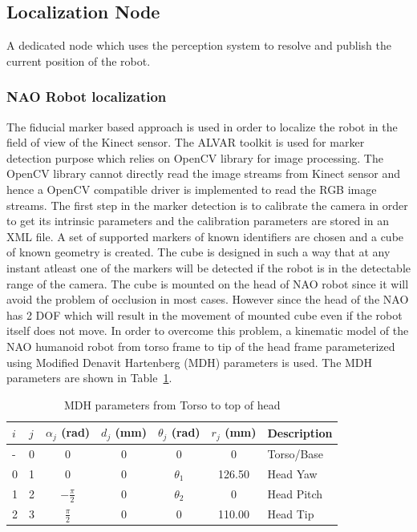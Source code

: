 \subsection{Localization Node} A dedicated node which uses the perception system to resolve and publish the current position of the robot.

\subsubsection{NAO Robot localization}
The fiducial marker based approach is used in order to localize the robot in the field of view of the Kinect sensor. The ALVAR \cite{ALVAR} toolkit is used for marker detection purpose which relies on OpenCV library for image processing. The OpenCV library cannot directly read the image streams from Kinect sensor and hence a OpenCV compatible driver is implemented to read the RGB image streams. The first step in the marker detection is to calibrate the camera in order to get its intrinsic parameters and the calibration parameters are stored in an XML file. A set of supported markers of known identifiers are chosen and a cube of known geometry is created. The cube is designed in such a way that at any instant atleast one of the markers will be detected if the robot is in the detectable range of the camera. The cube is mounted on the head of NAO robot since it will avoid the problem of occlusion in most cases. However since the head of the NAO has 2 DOF which will result in the movement of mounted cube even if the robot itself does not move. In order to overcome this problem, a kinematic model of the NAO humanoid robot from torso frame to tip of the head frame parameterized using Modified Denavit Hartenberg (MDH) \cite{khalil2004modeling} parameters is used. The MDH parameters are shown in Table~\ref{table:nao_mdh}.

\begin{table}[H]
\centering
\small
\caption{MDH parameters from Torso to top of head}
\label{table:nao_mdh}
\begin{tabular}{|l|l|c|c|c|c|p{2cm}|}
\hline
  \textbf{$i$}  & \textbf{$j$}  & \textbf{$\alpha_j$ (rad)} & \textbf{$d_j$ (mm)} & \textbf{$\theta_j$ (rad)} & \textbf{$r_j$ (mm)} & \textbf{Description}
  \tabularnewline \hline
  - & 0 & 0 & 0 & 0 & 0 & Torso/Base
                                          \tabularnewline\hline
                                          
  0 & 1 & 0 & 0 & $\theta_1$ & 126.50 & Head Yaw
                                          \tabularnewline\hline
                       
  1 & 2 & $-\frac{\pi}{2}$ & 0 & $\theta_2$ & 0 & Head Pitch
                                          \tabularnewline\hline                    
  
  2 & 3 & $\frac{\pi}{2}$ & 0 & 0 & 110.00 & Head Tip
                                          \tabularnewline\hline
\end{tabular}
\end{table}

